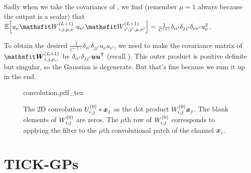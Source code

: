 \documentclass{article} %
\newcommand{\bracket}[3]{{\left#1 #3 \right#2}}
\newcommand{\bra}{\bracket{(}{)}}
\newcommand{\sqb}{\bracket{[}{]}}
\newcommand{\ssup}[1]{^\bra{#1}}
\newcommand{\tp}{\mathsf{T}}
\begin{document}
Sadly when we take the covariance of , we find
(remember $\mu=1$ always because the output is a scalar)
that $\E\sqb{u_\nu\etW\ssup{L+1}_{i,j,\mu,\nu}\; u_{\nu'}\etW\ssup{L+1}_{i',j',\mu,\nu'}} =
\frac{1}{C\ssup{L}}\delta_{ii'}\delta_{jj'}\delta_{\nu\nu'}u_\nu^2$.

To  obtain the desired
$\frac{1}{C\ssup{L}}\delta_{ii'}\delta_{jj'}u_\nu u_{\nu'}$, we need to make the
covariance matrix of $\tW\ssup{L+1}_{i,j,\mu, :}$ be $\delta_{ii'}\delta_{jj'}\vu\vu^\tp$
(recall ). This outer product is positive definite but
singular, so the Gaussian is degenerate. But that's fine because we sum it up in
the end.


\begin{figure}%
  \centerline{{convolution.pdf_tex}}
  \caption{The 2D convolution $\emU\ssup{0}_{i,j} * \vx_j$ as the dot product
    $\emW\ssup{0}_{i,j} \vx_j$. The blank elements of $\emW\ssup{0}_{i,j}$ are zeros.
    The $\mu$th row of $\emW\ssup{0}_{i,j}$ corresponds to applying the filter to the
    $\mu$th convolutional patch of the channel ${\bm{x}}_j$. \label{fig:conv-as-linear}}
\end{figure}
\section{TICK-GPs}



\end{document}
